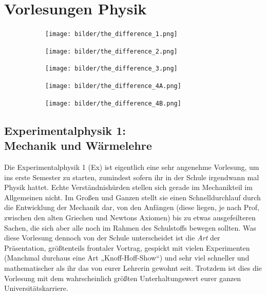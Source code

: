 \section{Vorlesungen Physik}

\begin{figure}[t]
    \centering
    \begin{subfigure}[b]{.18\textwidth}
    \texttt{[image: bilder/the\_difference\_1.png]}	    
    \end{subfigure}
    \begin{subfigure}[b]{.18\textwidth}
    \texttt{[image: bilder/the\_difference\_2.png]}
    \end{subfigure}
    \begin{subfigure}[b]{.18\textwidth}
    \texttt{[image: bilder/the\_difference\_3.png]}
    \end{subfigure}
    \begin{subfigure}[b]{.18\textwidth}
    \texttt{[image: bilder/the\_difference\_4A.png]}
    \end{subfigure}
    \begin{subfigure}[b]{.18\textwidth}
    \texttt{[image: bilder/the\_difference\_4B.png]}
    \end{subfigure}
\end{figure}

\subsection{Experimentalphysik 1: \\Mechanik und Wärmelehre}
\label{ex1}
Die Experimentalphysik 1 (\gls{Ex}) ist eigentlich eine sehr angenehme Vorlesung, um ins erste Semester zu starten, zumindest sofern ihr in der Schule irgendwann mal Physik hattet. Echte Verständnishürden stellen sich gerade im Mechanikteil im Allgemeinen nicht. Im Großen und Ganzen stellt sie einen Schnelldurchlauf durch die Entwicklung der Mechanik dar, von den Anfängen (diese liegen, je nach Prof, zwischen den alten Griechen und Newtons Axiomen) bis zu etwas ausgefeilteren Sachen, die sich aber alle noch im Rahmen des Schulstoffs bewegen sollten. Was diese Vorlesung dennoch von der Schule unterscheidet ist die \emph{Art} der Präsentation, größtenteils frontaler Vortrag, gespickt mit vielen Experimenten (Manchmal durchaus eine Art „Knoff-Hoff-Show“) und sehr viel schneller und mathematischer als ihr das von eurer Lehrerin gewohnt seit. Trotzdem ist dies die Vorlesung mit dem wahrscheinlich größten Unterhaltungswert eurer ganzen Universitätskarriere.



